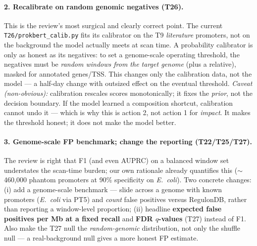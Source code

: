 \documentclass{article}
\begin{document}
\paragraph{2. Recalibrate on random genomic negatives (T26).}
This is the review's most surgical and clearly correct point. The current \texttt{T26/prokbert\_calib.py} fits its calibrator on the T9 \emph{literature} promoters, not on the background the model actually meets at scan time. A probability calibrator is only as honest as its negatives: to set a genome-scale operating threshold, the negatives must be \emph{random windows from the target genome} (plus a relative), masked for annotated genes/TSS. This changes only the calibration data, not the model --- a half-day change with outsized effect on the eventual threshold. \emph{Caveat (non-obvious):} calibration rescales scores monotonically; it fixes the \emph{prior}, not the decision boundary. If the model learned a composition shortcut, calibration cannot undo it --- which is why this is action 2, not action 1 for \emph{impact}. It makes the threshold honest; it does not make the model better.

\paragraph{3. Genome-scale FP benchmark; change the reporting (T22/T25/T27).}
The review is right that F1 (and even AUPRC) on a balanced window set understates the scan-time burden; our own rationale already quantifies this ($\sim$460{,}000 phantom promoters at 90\% specificity on \emph{E.\ coli}). Two concrete changes: (i) add a genome-scale benchmark --- slide across a genome with known promoters (\emph{E.\ coli} via PT5) and \emph{count} false positives versus RegulonDB, rather than reporting a window-level proportion; (ii) headline \textbf{expected false positives per Mb at a fixed recall} and \textbf{FDR $q$-values} (T27) instead of F1. Also make the T27 null the \emph{random-genomic} distribution, not only the shuffle null --- a real-background null gives a more honest FP estimate.
\end{document}
